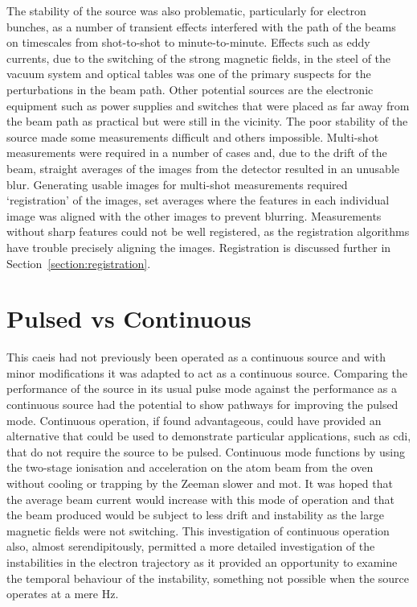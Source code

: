 The stability of the source was also problematic, particularly for electron bunches, as a number of transient effects interfered with the path of the beams on timescales from shot-to-shot to minute-to-minute.
Effects such as eddy currents, due to the switching of the strong magnetic fields, in the steel of the vacuum system and optical tables was one of the primary suspects for the perturbations in the beam path.
Other potential sources are the electronic equipment such as power supplies and switches that were placed as far away from the beam path as practical but were still in the vicinity.
The poor stability of the source made some measurements difficult and others impossible.
Multi-shot measurements were required in a number of cases and, due to the drift of the beam, straight averages of the images from the detector resulted in an unusable blur.
Generating usable images for multi-shot measurements required `registration' of the images, set averages where the features in each individual image was aligned with the other images to prevent blurring.
Measurements without sharp features could not be well registered, as the registration algorithms have trouble precisely aligning the images.
Registration is discussed further in Section~\ref{section:registration}.

\section{Pulsed vs Continuous}\label{section:pulse_vs_continuous}
This \gls{caeis} had not previously been operated as a continuous source and with minor modifications it was adapted to act as a continuous source.
Comparing the performance of the source in its usual pulse mode against the performance as a continuous source had the potential to show pathways for improving the pulsed mode.
Continuous operation, if found advantageous, could have provided an alternative that could be used to demonstrate particular applications, such as \gls{cdi}, that do not require the source to be pulsed.
Continuous mode functions by using the two-stage ionisation and acceleration on the atom beam from the oven without cooling or trapping by the Zeeman slower and \gls{mot}.
It was hoped that the average beam current would increase with this mode of operation and that the beam produced would be subject to less drift and instability as the large magnetic fields were not switching.
This investigation of continuous operation also, almost serendipitously, permitted a more detailed investigation of the instabilities in the electron trajectory as it provided an opportunity to examine the temporal behaviour of the instability, something not possible when the source operates at a mere \unit[10]{Hz}.

